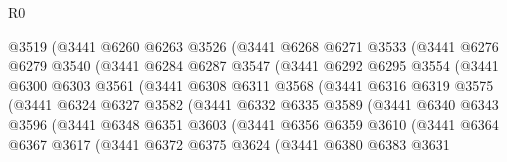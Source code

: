 \begin{lexlean}{R0}
\begin{coremodule}
                  @3519
                  (@3441
                    @6260
                    @6263
                    @3526
                    (@3441
                      @6268
                      @6271
                      @3533
                      (@3441
                        @6276
                        @6279
                        @3540
                        (@3441
                          @6284
                          @6287
                          @3547
                          (@3441
                            @6292
                            @6295
                            @3554
                            (@3441
                              @6300
                              @6303
                              @3561
                              (@3441
                                @6308
                                @6311
                                @3568
                                (@3441
                                  @6316
                                  @6319
                                  @3575
                                  (@3441
                                    @6324
                                    @6327
                                    @3582
                                    (@3441
                                      @6332
                                      @6335
                                      @3589
                                      (@3441
                                        @6340
                                        @6343
                                        @3596
                                        (@3441
                                          @6348
                                          @6351
                                          @3603
                                          (@3441
                                            @6356
                                            @6359
                                            @3610
                                            (@3441
                                              @6364
                                              @6367
                                              @3617
                                              (@3441
                                                @6372
                                                @6375
                                                @3624
                                                (@3441
                                                  @6380
                                                  @6383
                                                  @3631

\end{coremodule}
\end{lexlean}
